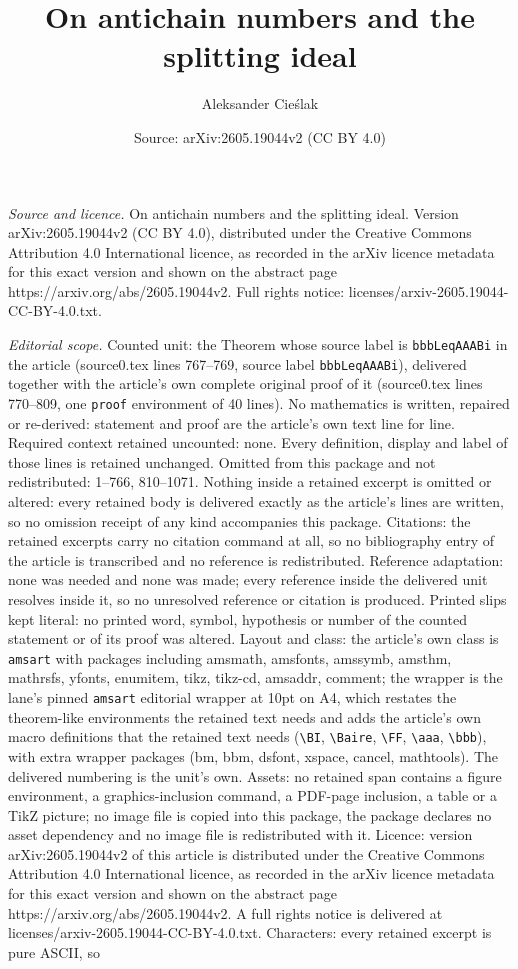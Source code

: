 \documentclass[10pt,a4paper]{amsart}
\title[On antichain numbers and the splitting ideal]{On antichain numbers and the splitting ideal}
\author{Aleksander Cie\'slak}
\date{Source: arXiv:2605.19044v2 (CC BY 4.0)}
\begin{document}
\maketitle

\noindent\emph{Source and licence.} On antichain numbers and the splitting ideal. Version arXiv:2605.19044v2 (CC BY 4.0), distributed under the Creative Commons Attribution 4.0 International licence, as recorded in the arXiv licence metadata for this exact version and shown on the abstract page https://arxiv.org/abs/2605.19044v2. Full rights notice: licenses/arxiv-2605.19044-CC-BY-4.0.txt.\par\smallskip

\noindent\textit{Editorial scope.} Counted unit: the Theorem whose source label is \texttt{bbbLeqAAABi} in the article (source0.tex lines 767--769, source label \texttt{bbbLeqAAABi}), delivered together with the article's own complete original proof of it (source0.tex lines 770--809, one \texttt{proof} environment of 40 lines). No mathematics is written, repaired or re-derived: statement and proof are the article's own text line for line. Required context retained uncounted: none. Every definition, display and label of those lines is retained unchanged. Omitted from this package and not redistributed: 1--766, 810--1071. Nothing inside a retained excerpt is omitted or altered: every retained body is delivered exactly as the article's lines are written, so no omission receipt of any kind accompanies this package. Citations: the retained excerpts carry no citation command at all, so no bibliography entry of the article is transcribed and no reference is redistributed. Reference adaptation: none was needed and none was made; every reference inside the delivered unit resolves inside it, so no unresolved reference or citation is produced. Printed slips kept literal: no printed word, symbol, hypothesis or number of the counted statement or of its proof was altered. Layout and class: the article's own class is \texttt{amsart} with packages including amsmath, amsfonts, amssymb, amsthm, mathrsfs, yfonts, enumitem, tikz, tikz-cd, amsaddr, comment; the wrapper is the lane's pinned \texttt{amsart} editorial wrapper at 10pt on A4, which restates the theorem-like environments the retained text needs and adds the article's own macro definitions that the retained text needs (\texttt{\textbackslash BI}, \texttt{\textbackslash Baire}, \texttt{\textbackslash FF}, \texttt{\textbackslash aaa}, \texttt{\textbackslash bbb}), with extra wrapper packages (bm, bbm, dsfont, xspace, cancel, mathtools). The delivered numbering is the unit's own. Assets: no retained span contains a figure environment, a graphics-inclusion command, a PDF-page inclusion, a table or a TikZ picture; no image file is copied into this package, the package declares no asset dependency and no image file is redistributed with it. Licence: version arXiv:2605.19044v2 of this article is distributed under the Creative Commons Attribution 4.0 International licence, as recorded in the arXiv licence metadata for this exact version and shown on the abstract page https://arxiv.org/abs/2605.19044v2. A full rights notice is delivered at licenses/arxiv-2605.19044-CC-BY-4.0.txt. Characters: every retained excerpt is pure ASCII, so 
\end{document}
